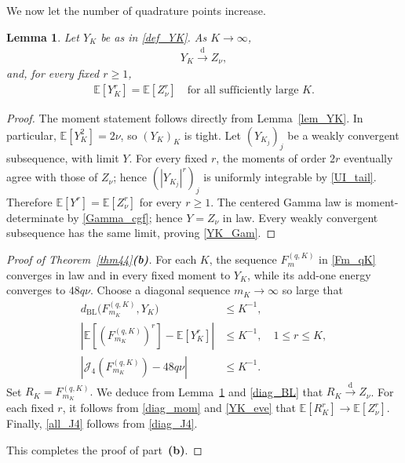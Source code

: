 \documentclass[letterpaper,11pt,reqno]{amsart}
\numberwithin{equation}{section}
\theoremstyle{plain}
\newtheorem{lemma}[theorem]{Lemma}
\theoremstyle{definition}
\theoremstyle{remark}
\newcommand{\E}{\mathbb{E}}
\newcommand{\noi}{\noindent}
\newcommand{\Jfour}{\mathcal J_4}
\begin{document}
We now let the number of quadrature points increase.

\begin{lemma}
\label{lem_YK_Gam}
Let $Y_K$ be as in \eqref{def_YK}.
As $K\to\infty$,
\noi
\begin{align}
 Y_K\xrightarrow{\mathrm d}Z_\nu,
 \label{YK_Gam}
\end{align}
and, for every fixed $r\geq1$,
\noi
\begin{align}
 \E[Y_K^r]=\E[Z_\nu^r]
 \quad\text{for all sufficiently large }K.
 \label{YK_eve}
\end{align}
\end{lemma}

\begin{proof}

The moment statement follows directly from Lemma~\ref{lem_YK}.  In
particular, $\E[Y_K^2]=2\nu$, so $(Y_K)_K$ is tight.  Let
$(Y_{K_j})_j$ be a weakly convergent subsequence, with limit $Y$.
For every fixed $r$, the moments of order $2r$ eventually agree with
those of $Z_\nu$; hence $(|Y_{K_j}|^r)_j$ is uniformly integrable by
\eqref{UI_tail}.  Therefore
$\E[Y^r]=\E[Z_\nu^r]$
for every $r\geq1$.
The centered Gamma law is moment-determinate by \eqref{Gamma_cgf};
hence $Y=Z_\nu$ in law.  Every weakly convergent
subsequence has the same limit, proving \eqref{YK_Gam}.
\end{proof}

\begin{proof}[Proof of Theorem~\ref{thm44}{\rm\bf(b)}]
For each $K$, the sequence $F_m^{(q,K)}$ in \eqref{Fm_qK} converges in
law and in every fixed moment to $Y_K$, while its add-one energy
converges to $48q\nu$.  Choose a diagonal sequence $m_K\to\infty$ so
large that
\noi
\begin{align}
 d_{\mathrm{BL}}
 \bigl(F_{m_K}^{(q,K)},Y_K\bigr)&\leq K^{-1},
 \label{diag_BL}\\
 \left|
 \E[(F_{m_K}^{(q,K)})^r]-\E[Y_K^r]
 \right|&\leq K^{-1},
 \quad1\leq r\leq K,
 \label{diag_mom}\\
 \left|
 \Jfour(F_{m_K}^{(q,K)})-48q\nu
 \right|&\leq K^{-1}.
 \label{diag_J4}
\end{align}
Set
$R_K=F_{m_K}^{(q,K)}.$
We deduce from Lemma~\ref{lem_YK_Gam} and \eqref{diag_BL} that
$R_K\xrightarrow{\mathrm d}Z_\nu$.  For each fixed $r$, it follows from
\eqref{diag_mom} and \eqref{YK_eve} that
$\E[R_K^r]\to\E[Z_\nu^r]$.  Finally, \eqref{all_J4} follows from
\eqref{diag_J4}.

This completes the proof of part~{\bf(b)}.
\qedhere


\end{proof}
\end{document}
